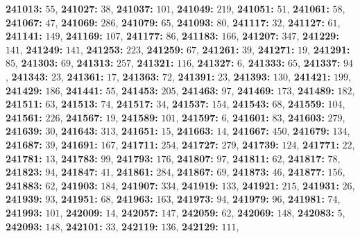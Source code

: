 \textsf{\bfseries 241013:} $55$, \textsf{\bfseries 241027:} $38$, \textsf{\bfseries 241037:} $101$, \textsf{\bfseries 241049:} $219$, \textsf{\bfseries 241051:} $51$, \textsf{\bfseries 241061:} $58$, \textsf{\bfseries 241067:} $47$, \textsf{\bfseries 241069:} $286$, \textsf{\bfseries 241079:} $65$, \textsf{\bfseries 241093:} $80$, \textsf{\bfseries 241117:} $32$, \textsf{\bfseries 241127:} $61$, \textsf{\bfseries 241141:} $149$, \textsf{\bfseries 241169:} $107$, \textsf{\bfseries 241177:} $86$, \textsf{\bfseries 241183:} $166$, \textsf{\bfseries 241207:} $347$, \textsf{\bfseries 241229:} $141$, \textsf{\bfseries 241249:} $141$, \textsf{\bfseries 241253:} $223$, \textsf{\bfseries 241259:} $67$, \textsf{\bfseries 241261:} $39$, \textsf{\bfseries 241271:} $19$, \textsf{\bfseries 241291:} $85$, \textsf{\bfseries 241303:} $69$, \textsf{\bfseries 241313:} $257$, \textsf{\bfseries 241321:} $116$, \textsf{\bfseries 241327:} $6$, \textsf{\bfseries 241333:} $65$, \textsf{\bfseries 241337:} $94$, \textsf{\bfseries 241343:} $23$, \textsf{\bfseries 241361:} $17$, \textsf{\bfseries 241363:} $72$, \textsf{\bfseries 241391:} $23$, \textsf{\bfseries 241393:} $130$, \textsf{\bfseries 241421:} $199$, \textsf{\bfseries 241429:} $186$, \textsf{\bfseries 241441:} $55$, \textsf{\bfseries 241453:} $205$, \textsf{\bfseries 241463:} $97$, \textsf{\bfseries 241469:} $173$, \textsf{\bfseries 241489:} $182$, \textsf{\bfseries 241511:} $63$, \textsf{\bfseries 241513:} $74$, \textsf{\bfseries 241517:} $34$, \textsf{\bfseries 241537:} $154$, \textsf{\bfseries 241543:} $68$, \textsf{\bfseries 241559:} $104$, \textsf{\bfseries 241561:} $226$, \textsf{\bfseries 241567:} $19$, \textsf{\bfseries 241589:} $101$, \textsf{\bfseries 241597:} $6$, \textsf{\bfseries 241601:} $83$, \textsf{\bfseries 241603:} $279$, \textsf{\bfseries 241639:} $30$, \textsf{\bfseries 241643:} $313$, \textsf{\bfseries 241651:} $15$, \textsf{\bfseries 241663:} $14$, \textsf{\bfseries 241667:} $450$, \textsf{\bfseries 241679:} $134$, \textsf{\bfseries 241687:} $39$, \textsf{\bfseries 241691:} $167$, \textsf{\bfseries 241711:} $254$, \textsf{\bfseries 241727:} $279$, \textsf{\bfseries 241739:} $124$, \textsf{\bfseries 241771:} $22$, \textsf{\bfseries 241781:} $13$, \textsf{\bfseries 241783:} $99$, \textsf{\bfseries 241793:} $176$, \textsf{\bfseries 241807:} $97$, \textsf{\bfseries 241811:} $62$, \textsf{\bfseries 241817:} $78$, \textsf{\bfseries 241823:} $94$, \textsf{\bfseries 241847:} $41$, \textsf{\bfseries 241861:} $284$, \textsf{\bfseries 241867:} $69$, \textsf{\bfseries 241873:} $46$, \textsf{\bfseries 241877:} $156$, \textsf{\bfseries 241883:} $62$, \textsf{\bfseries 241903:} $184$, \textsf{\bfseries 241907:} $334$, \textsf{\bfseries 241919:} $133$, \textsf{\bfseries 241921:} $215$, \textsf{\bfseries 241931:} $26$, \textsf{\bfseries 241939:} $93$, \textsf{\bfseries 241951:} $68$, \textsf{\bfseries 241963:} $163$, \textsf{\bfseries 241973:} $94$, \textsf{\bfseries 241979:} $96$, \textsf{\bfseries 241981:} $74$, \textsf{\bfseries 241993:} $101$, \textsf{\bfseries 242009:} $14$, \textsf{\bfseries 242057:} $147$, \textsf{\bfseries 242059:} $62$, \textsf{\bfseries 242069:} $148$, \textsf{\bfseries 242083:} $5$, \textsf{\bfseries 242093:} $148$, \textsf{\bfseries 242101:} $33$, \textsf{\bfseries 242119:} $136$, \textsf{\bfseries 242129:} $111$, 
